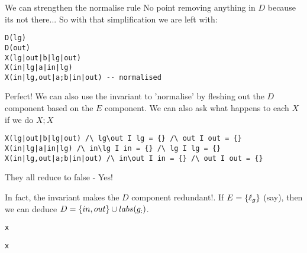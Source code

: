 We can strengthen the normalise rule
No point removing anything in $D$ because its not there...
So with that simplification we are left with:
{\footnotesize\begin{verbatim}
D(lg)
D(out)
X(lg|out|b|lg|out)
X(in|lg|a|in|lg)
X(in|lg,out|a;b|in|out) -- normalised
\end{verbatim}}
Perfect!
We can also use the invariant to 'normalise' by fleshing out the $D$
component based on the $E$ component.
We can also ask what happens to each $X$ if we do $X;X$
{\footnotesize\begin{verbatim}
X(lg|out|b|lg|out) /\ lg\out I lg = {} /\ out I out = {}
X(in|lg|a|in|lg) /\ in\lg I in = {} /\ lg I lg = {}
X(in|lg,out|a;b|in|out) /\ in\out I in = {} /\ out I out = {}
\end{verbatim}}
They all reduce to false - Yes!

In fact, the invariant makes the $D$ component redundant!.
If $E=\{{\ell_g}\}$ (say),
then we can deduce $D = \{{in,out}\}\cup labs(g_{:})$.

\newpage
{\footnotesize\begin{verbatim}
x
\end{verbatim}}

\newpage
{\footnotesize\begin{verbatim}
x
\end{verbatim}}

